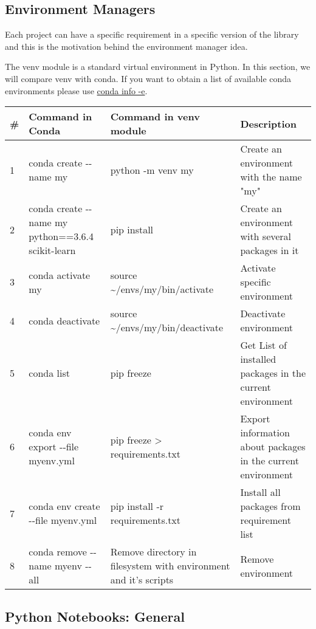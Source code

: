 \documentclass[
]{article}
\begin{document}
\hypertarget{environment-managers}{%
\subsection{Environment Managers}\label{environment-managers}}

Each project can have a specific requirement in a specific version of
the library and this is the motivation behind the environment manager
idea.

The venv module is a standard virtual environment in Python. In this
section, we will compare venv with conda. If you want to obtain a list
of available conda environments please use
\href{https://docs.conda.io/projects/conda/en/main/commands/info.html}{conda
info -e}.

\begin{longtable}[]{@{}llll@{}}
\toprule
\# & \textbf{Command in Conda} & \textbf{Command in venv module} &
\textbf{Description} \\
\midrule
\endhead
1 & conda create -\/-name my & python -m venv my & Create an environment
with the name "my" \\
2 & conda create -\/-name my python==3.6.4 scikit-learn & pip install &
Create an environment with several packages in it \\
3 & conda activate my & source \textasciitilde/envs/my/bin/activate &
Activate specific environment \\
4 & conda deactivate & source \textasciitilde/envs/my/bin/deactivate &
Deactivate environment \\
5 & conda list & pip freeze & Get List of installed packages in the
current environment \\
6 & conda env export -\/-file myenv.yml & pip freeze \textgreater{}
requirements.txt & Export information about packages in the current
environment \\
7 & conda env create -\/-file myenv.yml & pip install -r
requirements.txt & Install all packages from requirement list \\
8 & conda remove -\/-name myenv -\/-all & Remove directory in filesystem
with environment and it's scripts & Remove environment \\
\bottomrule
\end{longtable}

\hypertarget{python-notebooks-general}{%
\subsection{Python Notebooks: General}\label{python-notebooks-general}}
\end{document}
